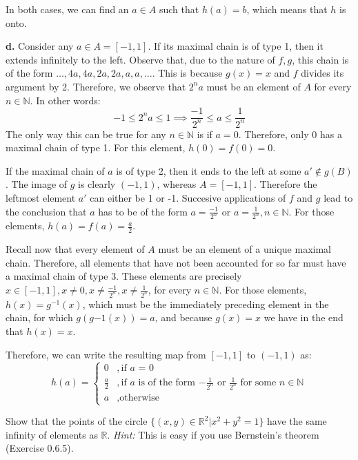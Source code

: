 \begin{solution}
    In both cases, we can find an $a \in A$ such that $h(a) = b$, which means that $h$ is onto.

    \textbf{d.} Consider any $a \in A=[-1,1]$. If its maximal chain is of type 1, then it extends infinitely to the left. Observe that, due to the nature of $f, g$, this chain is of the form $\ldots, 4a, 4a, 2a, 2a, a, a, \ldots$. This is because $g(x) = x$ and $f$ divides its argument by 2. Therefore, we observe that $2^n a$ must be an element of $A$ for every $n \in \mathbb{N}$. In other words:
    $$-1 \leq 2^n a \leq 1 \implies \frac{-1}{2^n} \leq a \leq \frac{1}{2^n}$$
    The only way this can be true for any $n \in \mathbb{N}$ is if $a = 0$. Therefore, only 0 has a maximal chain of type 1. For this element, $h(0) = f(0) = 0$.

    If the maximal chain of $a$ is of type 2, then it ends to the left at some $a' \notin g(B)$. The image of $g$ is clearly $(-1, 1)$, whereas $A = [-1, 1]$. Therefore the leftmost element $a'$ can either be 1 or -1. Succesive applications of $f$ and $g$ lead to the conclusion that $a$ has to be of the form $a = \frac{-1}{2^n}$ or $a = \frac{1}{2^n}, n \in \mathbb{N}$. For those elements, $h(a) = f(a) = \frac{a}{2}$.

    Recall now that every element of $A$ must be an element of a unique maximal chain. Therefore, all elements that have not been accounted for so far must have a maximal chain of type 3. These elements are precisely $x \in [-1, 1], x \neq 0, x \neq \frac{-1}{2^n}, x \neq \frac{1}{2^n}$, for every $n \in \mathbb{N}$. For those elements, $h(x) = g^{-1}(x)$, which must be the immediately preceding element in the chain, for which $g(g{-1}(x)) = a$, and because $g(x) = x$ we have in the end that $h(x) = x$.

    Therefore, we can write the resulting map from $[-1, 1]$ to $(-1, 1)$ as:
    $$h(a) =  \begin{cases} 
      0 &, \text{if $a$ = 0} \\
      \frac{a}{2} &, \text{if $a$ is of the form $-\frac{1}{2^n}$ or $\frac{1}{2^n}$ for some $n \in \mathbb{N}$} \\
      a &, \text{otherwise}
   \end{cases}$$
\end{solution}

\begin{exercise}{6}
    Show that the points of the circle $\{(x, y) \in \mathbb{R}^2 \lvert x^2 + y^2 = 1\}$ have the same infinity of elements as $\mathbb{R}$. \textit{Hint:} This is easy if you use Bernstein's theorem (Exercise 0.6.5).
\end{exercise}

